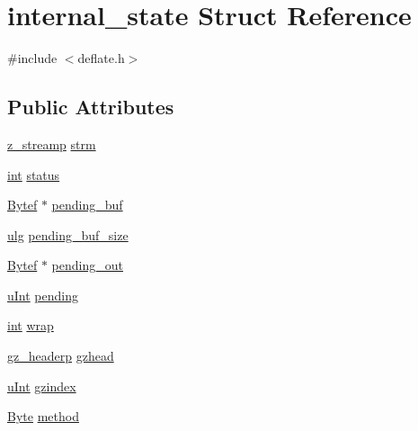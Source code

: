 \hypertarget{structinternal__state}{\section{internal\-\_\-state Struct Reference}
\label{structinternal__state}
}


{\ttfamily \#include $<$deflate.\-h$>$}

\subsection*{Public Attributes}
\begin{DoxyCompactItemize}
\item 
\hyperlink{zlib_8h_a6ede25c84d3c9f8632305866acffb1d6}{z\-\_\-streamp} \hyperlink{structinternal__state_aaf558a49ab8c6caea3d131c6b913db42}{strm}
\item 
\hyperlink{ioapi_8h_a787fa3cf048117ba7123753c1e74fcd6}{int} \hyperlink{structinternal__state_a8756cacdbac452a2633f87e06fae6c52}{status}
\item 
\hyperlink{zconf_8h_aeb722a888064be47e12d05f692e0f407}{Bytef} $\ast$ \hyperlink{structinternal__state_ae5f393e8d0d569da6038749768f65b94}{pending\-\_\-buf}
\item 
\hyperlink{zutil_8h_abd6f60bf9450af2ecb94097a32c19a64}{ulg} \hyperlink{structinternal__state_a9100ecccf2f8bb474f0bcc7c69f55c27}{pending\-\_\-buf\-\_\-size}
\item 
\hyperlink{zconf_8h_aeb722a888064be47e12d05f692e0f407}{Bytef} $\ast$ \hyperlink{structinternal__state_a6e15ed78675c3c7bdb312623b5eceb7a}{pending\-\_\-out}
\item 
\hyperlink{zconf_8h_a87d141052bcd5ec8a80812a565c70369}{u\-Int} \hyperlink{structinternal__state_ac92f5b70c269be4685539daef10b15a3}{pending}
\item 
\hyperlink{ioapi_8h_a787fa3cf048117ba7123753c1e74fcd6}{int} \hyperlink{structinternal__state_ae80327ea7ad4ad0ef5baeef5ef3a6807}{wrap}
\item 
\hyperlink{zlib_8h_a40e9dcc294796d99b25e98fb06477fc8}{gz\-\_\-headerp} \hyperlink{structinternal__state_ac023d0c9e6112dfe6cbd049a56484997}{gzhead}
\item 
\hyperlink{zconf_8h_a87d141052bcd5ec8a80812a565c70369}{u\-Int} \hyperlink{structinternal__state_a5e09188a83aadfcb0db60b0765596aa1}{gzindex}
\item 
\hyperlink{zconf_8h_ae3a497195d617519e5353ea7b417940f}{Byte} \hyperlink{structinternal__state_aeb38f8a255e975e703595577ea43220b}{method}

\end{DoxyCompactItemize}
